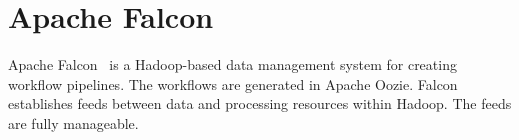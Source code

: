 \section{Apache Falcon}

Apache Falcon~\cite{hid-sp18-www-526-apache-falcon} is
a Hadoop-based data management system for creating
workflow pipelines. The workflows are generated in Apache
Oozie. Falcon establishes feeds between data and processing
resources within Hadoop. The feeds are fully manageable.
